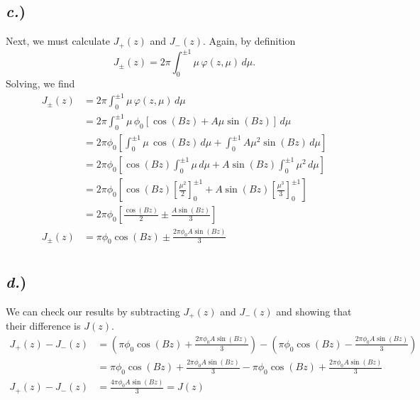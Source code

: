 \documentclass{article}
\begin{document}
\subsection*{\textit{c.})}

Next, we must calculate $J_{+}(z)$ and $J_{-}(z)$. Again, by definition
$$ J_{\pm}(z) = 2\pi \int_0^{\pm1} \mu \, \varphi(z,\mu) \, d\mu .$$
Solving, we find
\begin{align*}
J_{\pm}(z)	&= 2\pi \int_0^{\pm1} \mu \, \varphi(z,\mu) \, d\mu \\
			&= 2\pi \int_0^{\pm1} \mu \, \phi_0 \left[\cos(Bz) + A \mu \sin(Bz)\right] \, d\mu \\
			&= 2\pi\phi_0 \left[ \int_0^{\pm1} \mu \, \cos(Bz) \, d\mu + \int_0^{\pm1} A \mu^2 \sin(Bz) \, d\mu \right] \\ 
			&= 2\pi\phi_0 \left[ \cos(Bz) \int_0^{\pm1} \mu \, d\mu + A \sin(Bz) \int_0^{\pm1} \mu^2 \, d\mu \right] \\ 
			&= 2\pi\phi_0 \left[ \cos(Bz) \left[ \frac{\mu^2}{2} \right]_0^{\pm1} + A \sin(Bz) \left[ \frac{\mu^3}{3} \right]_0^{\pm1} \right] \\ 
			&= 2\pi\phi_0 \left[ \frac{\cos(Bz)}{2} \pm \frac{A \sin(Bz)}{3} \right] \\
J_{\pm}(z)	&= \pi\phi_0\cos(Bz) \pm \frac{2\pi\phi_0 A \sin(Bz)}{3} \\ 
\end{align*}


\subsection*{\textit{d.})}

We can check our results by subtracting $J_{+}(z)$ and $J_{-}(z)$ and showing that their difference is $J(z)$. 
\begin{align*}
J_{+}(z) - J_{-}(z)	&= \left(\pi\phi_0\cos(Bz) + \frac{2\pi\phi_0 A \sin(Bz)}{3}\right) - \left(\pi\phi_0\cos(Bz) - \frac{2\pi\phi_0 A \sin(Bz)}{3}\right) \\
					&= \pi\phi_0\cos(Bz) + \frac{2\pi\phi_0 A \sin(Bz)}{3} - \pi\phi_0\cos(Bz) + \frac{2\pi\phi_0 A \sin(Bz)}{3} \\
J_{+}(z) - J_{-}(z)	&= \frac{4\pi\phi_0 A \sin(Bz)}{3} = J(z)
\end{align*}





\end{document}
